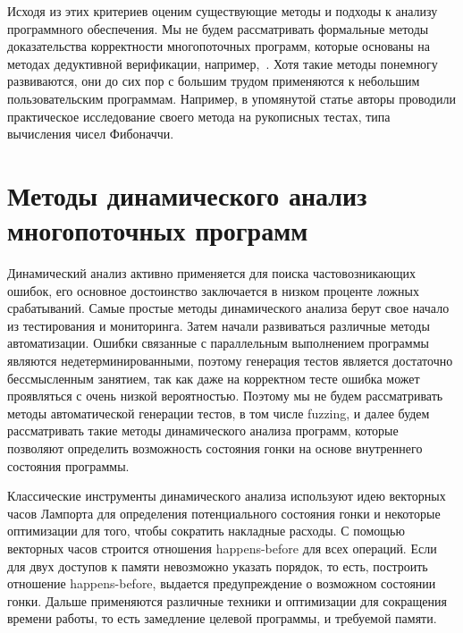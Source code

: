 Исходя из этих критериев оценим существующие методы и подходы к анализу программного обеспечения.
Мы не будем рассматривать формальные методы доказательства корректности многопоточных программ, которые основаны на методах дедуктивной верификации, например,~\cite{Le:2015:TRC}.
Хотя такие методы понемногу развиваются, они до сих пор с большим трудом применяются к небольшим пользовательским программам. 
Например, в упомянутой статье авторы проводили практическое исследование своего метода на рукописных тестах, типа вычисления чисел Фибоначчи.

\section{Методы динамического анализ многопоточных программ}
\label{rw:dynamic}

Динамический анализ активно применяется для поиска частовозникающих ошибок, его основное достоинство заключается в низком проценте ложных срабатываний.
Самые простые методы динамического анализа берут свое начало из тестирования и мониторинга.
Затем начали развиваться различные методы автоматизации.
Ошибки связанные с параллельным выполнением программы являются недетерминированными, поэтому генерация тестов является достаточно бессмысленным занятием, так как даже на корректном тесте ошибка может проявляться с очень низкой вероятностью.
Поэтому мы не будем рассматривать методы автоматической генерации тестов, в том числе fuzzing, и далее будем рассматривать такие методы динамического анализа программ, которые позволяют определить возможность состояния гонки на основе внутреннего состояния программы.

Классические инструменты динамического анализа используют идею векторных часов Лампорта для определения потенциального состояния гонки и некоторые оптимизации для того, чтобы сократить накладные расходы.
С помощью векторных часов строится отношения happens-before для всех операций.
Если для двух доступов к памяти невозможно указать порядок, то есть, построить отношение happens-before, выдается предупреждение о возможном состоянии гонки. 
Дальше применяются различные техники и оптимизации для сокращения времени работы, то есть замедление целевой программы, и требуемой памяти.

